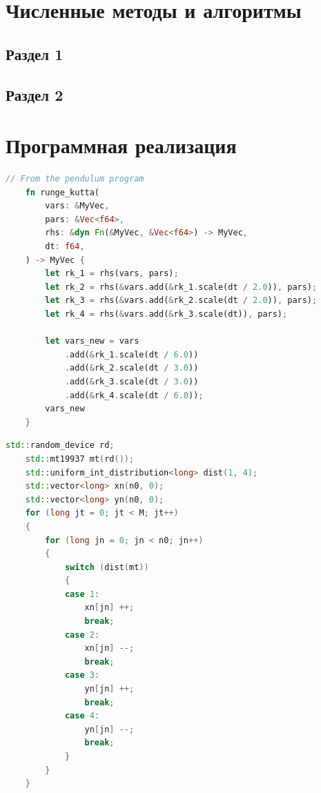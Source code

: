 \documentclass[a4paper,14pt]{extarticle}
\begin{document}
\section{Численные методы и алгоритмы}

\subsection{Раздел 1}

\subsection{Раздел 2}

\pagebreak
\section{Программная реализация}

\begin{lstlisting}[language=rust,caption={Программная реализация метода Рунге-Кутты},label={listing-1}]
    // From the pendulum program
    fn runge_kutta(
        vars: &MyVec,
        pars: &Vec<f64>,
        rhs: &dyn Fn(&MyVec, &Vec<f64>) -> MyVec,
        dt: f64,
    ) -> MyVec {
        let rk_1 = rhs(vars, pars);
        let rk_2 = rhs(&vars.add(&rk_1.scale(dt / 2.0)), pars);
        let rk_3 = rhs(&vars.add(&rk_2.scale(dt / 2.0)), pars);
        let rk_4 = rhs(&vars.add(&rk_3.scale(dt)), pars);
    
        let vars_new = vars
            .add(&rk_1.scale(dt / 6.0))
            .add(&rk_2.scale(dt / 3.0))
            .add(&rk_3.scale(dt / 3.0))
            .add(&rk_4.scale(dt / 6.0));
        vars_new
    }
    \end{lstlisting}
    
    \begin{lstlisting}[language=C++,caption={Подпрограмма случайного блуждания на плоскости},label={listing-2}]
    std::random_device rd;
    std::mt19937 mt(rd());
    std::uniform_int_distribution<long> dist(1, 4);
    std::vector<long> xn(n0, 0);
    std::vector<long> yn(n0, 0);
    for (long jt = 0; jt < M; jt++)
    {
        for (long jn = 0; jn < n0; jn++)
        {
            switch (dist(mt))
            {
            case 1:
                xn[jn] ++;
                break;
            case 2:
                xn[jn] --;
                break;
            case 3:
                yn[jn] ++;
                break;
            case 4:
                yn[jn] --;
                break;
            }
        }
    }
    \end{lstlisting}
\end{document}
